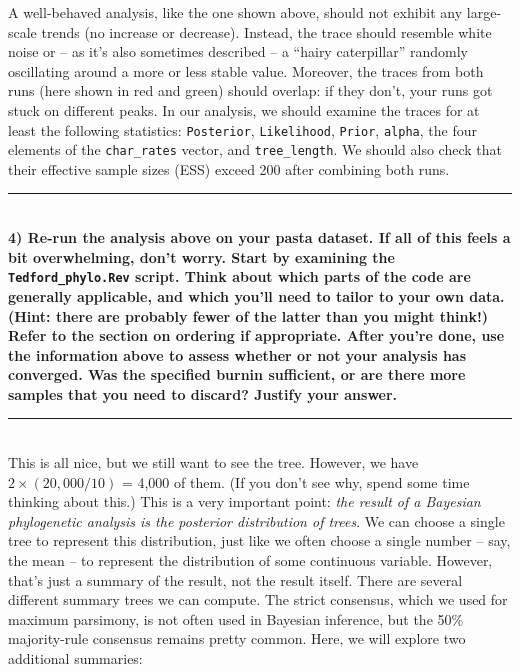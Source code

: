 \documentclass[12pt]{article}
\begin{document}
\noindent  A well-behaved analysis, like the one shown above, should not exhibit any large-scale trends (no increase or decrease). Instead, the trace should resemble white noise or -- as it's also sometimes described -- a ``hairy caterpillar'' randomly oscillating around a more or less stable value. Moreover, the traces from both runs (here shown in red and green) should overlap: if they don't, your runs got stuck on different peaks. In our analysis, we should examine the traces for at least the following statistics: \texttt{Posterior}, \texttt{Likelihood}, \texttt{Prior}, \texttt{alpha}, the four elements of the \texttt{char\_rates} vector, and \texttt{tree\_length}. We should also check that their effective sample sizes (ESS) exceed 200 after combining both runs. \\

\hrule
\ \\[1ex]
\textbf{4) Re-run the analysis above on your pasta dataset. If all of this feels a bit overwhelming, don't worry. Start by examining the \texttt{Tedford\_phylo.Rev} script. Think about which parts of the code are generally applicable, and which you'll need to tailor to your own data. (Hint: there are probably fewer of the latter than you might think!) Refer to the section on ordering if appropriate. After you're done, use the information above to assess whether or not your analysis has converged. Was the specified burnin sufficient, or are there more samples that you need to discard? Justify your answer.} \\
\hrule
\ \\[1ex]
\noindent This is all nice, but we still want to see the tree. However, we have $2 \times (20,000/10)$ = 4,000 of them. (If you don't see why, spend some time thinking about this.) This is a very important point: \textit{the result of a Bayesian phylogenetic analysis is the posterior distribution of trees}. We can choose a single tree to represent this distribution, just like we often choose a single number -- say, the mean -- to represent the distribution of some continuous variable. However, that's just a summary of the result, not the result itself. There are several different summary trees we can compute. The strict consensus, which we used for maximum parsimony, is not often used in Bayesian inference, but the 50\% majority-rule consensus remains pretty common. Here, we will explore two additional summaries:
\end{document}
